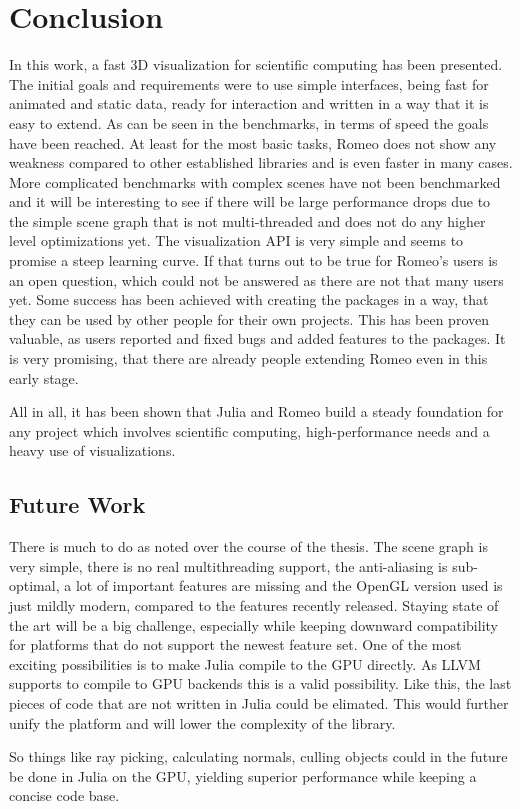 \section{Conclusion}

In this work, a fast 3D visualization for scientific computing has been presented. 
The initial goals and requirements were to use simple interfaces, being fast for animated and static data, ready for interaction and written in a way that it is easy to extend.
As can be seen in the benchmarks, in terms of speed the goals have been reached. 
At least for the most basic tasks, Romeo does not show any weakness compared to other established libraries and is even faster in many cases.
More complicated benchmarks with complex scenes have not been benchmarked and it will be interesting to see if there will be large performance drops due to the simple scene graph that is not multi-threaded and does not do any higher level optimizations yet.
The visualization API is very simple and seems to promise a steep learning curve.
If that turns out to be true for Romeo's users is an open question, which could not be answered as there are not that many users yet.
Some success has been achieved with creating the packages in a way, that they can be used by other people for their own projects. This has been proven valuable, as users reported and fixed bugs and added features to the packages.
It is very promising, that there are already people extending Romeo even in this early stage.

All in all, it has been shown that Julia and Romeo build a steady foundation for any project which involves scientific computing, high-performance needs and a heavy use of visualizations. 

\subsection{Future Work}

There is much to do as noted over the course of the thesis. 
The scene graph is very simple, there is no real multithreading support, the anti-aliasing is sub-optimal, a lot of important features are missing and the OpenGL version used is just mildly modern, compared to the features recently released. 
Staying state of the art will be a big challenge, especially while keeping downward compatibility for platforms that do not support the newest feature set.
One of the most exciting possibilities is to make Julia compile to the GPU directly. As \ac{LLVM} supports to compile to GPU backends this is a valid possibility.
Like this, the last pieces of code that are not written in Julia could be elimated. 
This would further unify the platform and will lower the complexity of the library. 

So things like ray picking, calculating normals, culling objects could in the future be done in Julia on the GPU, yielding superior performance while keeping a concise code base.
